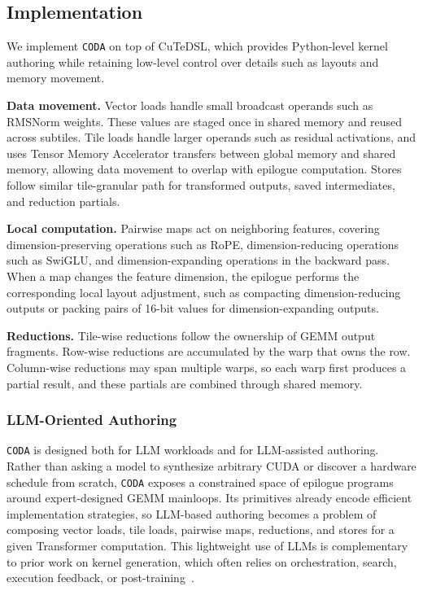 \subsection{Implementation}
\label{sec:implementations}

We implement \texttt{CODA} on top of CuTeDSL, which provides Python-level kernel authoring while retaining low-level control over details such as layouts and memory movement.

\textbf{Data movement.}
Vector loads handle small broadcast operands such as RMSNorm weights. These values are staged once in shared memory and reused across subtiles. Tile loads handle larger operands such as residual activations, and uses Tensor Memory Accelerator transfers between global memory and shared memory, allowing data movement to overlap with epilogue computation. Stores follow similar tile-granular path for transformed outputs, saved intermediates, and reduction partials.

\textbf{Local computation.}
Pairwise maps act on neighboring features, covering dimension-preserving operations such as RoPE, dimension-reducing operations such as SwiGLU, and dimension-expanding operations in the backward pass. When a map changes the feature dimension, the epilogue performs the corresponding local layout adjustment, such as compacting dimension-reducing outputs or packing pairs of 16-bit values for dimension-expanding outputs.

\textbf{Reductions.}
Tile-wise reductions follow the ownership of GEMM output fragments. Row-wise reductions are accumulated by the warp that owns the row. Column-wise reductions may span multiple warps, so each warp first produces a partial result, and these partials are combined through shared memory.

\subsubsection{LLM-Oriented Authoring}
\label{sec:llm-kernel-authoring}

\texttt{CODA} is designed both for LLM workloads and for LLM-assisted authoring. Rather than asking a model to synthesize arbitrary CUDA or discover a hardware schedule from scratch, \texttt{CODA} exposes a constrained space of epilogue programs around expert-designed GEMM mainloops. Its primitives already encode efficient implementation strategies, so LLM-based authoring becomes a problem of composing vector loads, tile loads, pairwise maps, reductions, and stores for a given Transformer computation. This lightweight use of LLMs is complementary to prior work on kernel generation, which often relies on orchestration, search, execution feedback, or post-training~\cite{ouyang2025kernelbench,su2025cuda,chen2025cuda,lange2025towards,yuksekgonul2026learning}.

